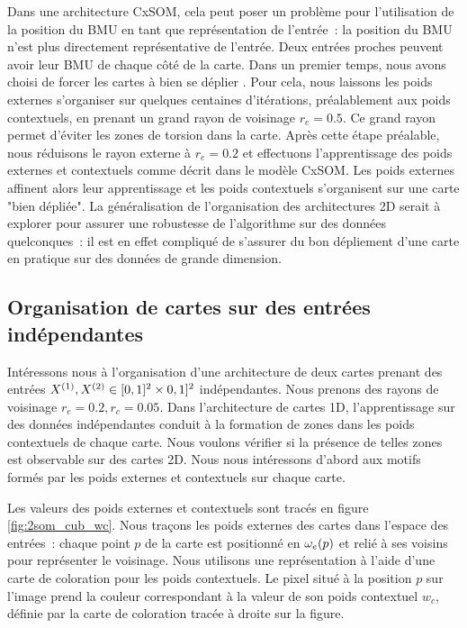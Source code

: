 \documentclass[../main]{subfiles}
\begin{document}
Dans une architecture CxSOM, cela peut poser un problème pour l'utilisation de la position du BMU en tant que représentation de l'entrée~: la position du BMU n'est plus directement représentative de l'entrée. Deux entrées proches peuvent avoir leur BMU de chaque côté de la carte.
Dans un premier temps, nous avons choisi de forcer les cartes à bien se déplier . Pour cela, nous laissons les poids externes s'organiser sur quelques centaines d'itérations, préalablement aux poids contextuels, en prenant un grand rayon de voisinage $r_e = 0.5$. 
Ce grand rayon permet d'éviter les zones de torsion dans la carte. Après cette étape préalable, nous réduisons le rayon externe  à $r_e = 0.2$ et effectuons l'apprentissage des poids externes et contextuels comme décrit dans le modèle CxSOM. Les poids externes affinent alors leur apprentissage et les poids contextuels s'organisent sur une carte "bien dépliée". 
La généralisation de l'organisation des architectures 2D serait à explorer pour assurer une robustesse de l'algorithme sur des données quelconques~: il est en effet compliqué de s'assurer du bon dépliement d'une carte en pratique sur des données de grande dimension.

\subsection{Organisation de cartes sur des entrées indépendantes}

Intéressons nous à l'organisation d'une architecture de deux cartes prenant des entrées $X^{({1})}, X^{({2})} \in [0,1]^2 \times 0,1]^2$ indépendantes. Nous prenons des rayons de voisinage $r_e = 0.2, r_c = 0.05$.
Dans l'architecture de cartes 1D, l'apprentissage sur des données indépendantes conduit à la formation de zones dans les poids contextuels de chaque carte. Nous voulons vérifier si la présence de telles zones est observable sur des cartes 2D.
Nous nous intéressons d'abord aux motifs formés par les poids externes et contextuels sur chaque carte.

Les valeurs des poids externes et contextuels sont tracés en figure \ref{fig:2som_cub_wc}.
Nous traçons les poids externes des cartes dans l'espace des entrées~: chaque point $p$ de la carte est positionné en $\omega_e(p)$ et relié à ses voisins pour représenter le voisinage.
Nous utilisons une représentation à l'aide d'une carte de coloration pour les poids contextuels. Le pixel situé à la position $p$ sur l'image prend la couleur correspondant à la valeur de son poids contextuel $w_c$, définie par la carte de coloration tracée à droite sur la figure.
\end{document}
